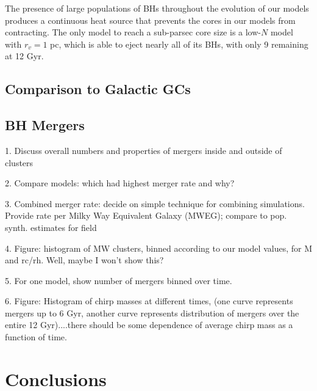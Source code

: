 \documentclass[12pt,preprint]{aastex}
\begin{document}
The presence of large populations of BHs throughout the evolution of our models
produces a continuous heat source that prevents the cores in our models from
contracting. The only model to reach a sub-parsec core size is a low-$N$ model with
$r_v=1$ pc, which is able to eject nearly all of its BHs, with only 9 remaining at 12 Gyr.





\subsection{Comparison to Galactic GCs}

\subsection{BH Mergers}
1. Discuss overall numbers and properties of mergers inside and outside of clusters

2. Compare models: which had highest merger rate and why?

3. Combined merger rate: decide on simple technique for combining simulations. Provide rate per Milky Way Equivalent Galaxy (MWEG); compare to pop. synth. estimates for field

4. Figure: histogram of MW clusters, binned according to our model values, for M and rc/rh.  Well, maybe I won't show this?

5. For one model, show number of mergers binned over time.

6. Figure: Histogram of chirp masses at different times, (one curve represents mergers up to 6 Gyr, another curve represents distribution of mergers over the entire 12 Gyr)....there should be some dependence of average chirp mass as a function of time.



\section{Conclusions}






\end{document}
